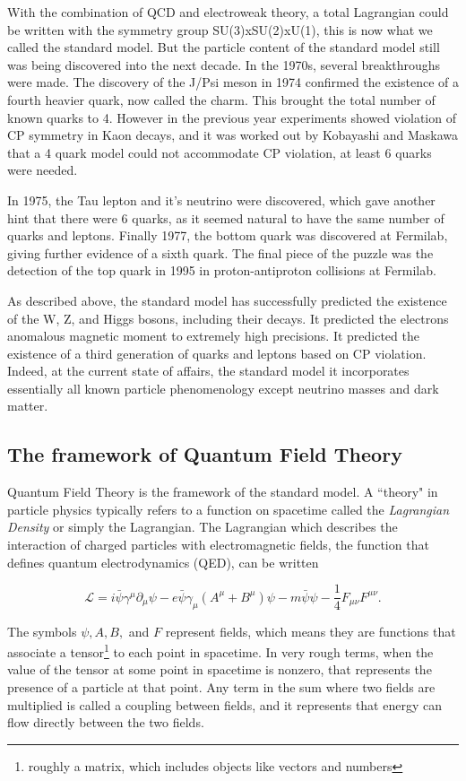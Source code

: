     With the combination of QCD and electroweak theory, a total Lagrangian could be written with the symmetry group SU(3)xSU(2)xU(1), this is now what we called the standard model. But the particle content of the standard model still was being discovered into the next decade. In the 1970s, several breakthroughs were made. The discovery of the J/Psi meson in 1974 confirmed the existence of a fourth heavier quark, now called the charm. This brought the total number of known quarks to 4. However in the previous year experiments showed violation of CP symmetry in Kaon decays, and it was worked out by Kobayashi and Maskawa that a 4 quark model could not accommodate CP violation, at least 6 quarks were needed. 

    In 1975, the Tau lepton and it's neutrino were discovered, which gave another hint that there were 6 quarks, as it seemed natural to have the same number of quarks and leptons. Finally 1977, the bottom quark was discovered at Fermilab, giving further evidence of a sixth quark. The final piece of the puzzle was the detection of the top quark in 1995 in proton-antiproton collisions at Fermilab.


    As described above, the standard model has successfully predicted the existence of the W, Z, and Higgs bosons, including their decays. It predicted the electrons anomalous magnetic moment to extremely high precisions. It predicted the existence of a third generation of quarks and leptons based on CP violation. Indeed, at the current state of affairs, the standard model it incorporates essentially all known particle phenomenology except neutrino masses and dark matter.

  \subsection{The framework of Quantum Field Theory}
    Quantum Field Theory is the framework of the standard model. A ``theory" in particle physics typically refers to a function on spacetime called the \emph{Lagrangian Density} or simply the Lagrangian. The Lagrangian which describes the interaction of charged particles with electromagnetic fields, the function that defines quantum electrodynamics (QED), can be written 

    \[
      \mathcal{L} = i \bar\psi \gamma^\mu \partial_\mu \psi - e\bar{\psi}\gamma_\mu (A^\mu+B^\mu) \psi -m \bar{\psi} \psi - \frac{1}{4}F_{\mu\nu}F^{\mu\nu}.
    \]

    The symbols $\psi, A, B,$ and $F$ represent fields, which means they are functions that associate a tensor\footnote{roughly a matrix, which includes objects like vectors and numbers} to each point in spacetime. In very rough terms, when the value of the tensor at some point in spacetime is nonzero, that represents the presence of a particle at that point. Any term in the sum where two fields are multiplied is called a coupling between fields, and it represents that energy can flow directly between the two fields.

